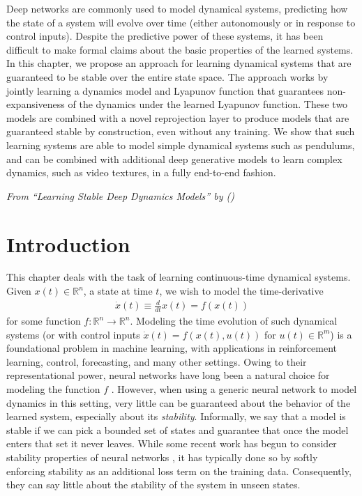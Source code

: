 Deep networks are commonly used to model dynamical systems, predicting how the state of a system will evolve over time (either autonomously or in response to control inputs). Despite the predictive power of these systems, it has been difficult to make formal claims about the basic properties of the learned systems. In this chapter, we propose an approach for learning dynamical systems that are guaranteed to be stable over the entire state space. The approach works by jointly learning a dynamics model and Lyapunov function that guarantees non-expansiveness of the dynamics under the learned Lyapunov function. These two models are combined with a novel reprojection layer to produce models that are guaranteed stable by construction, even without any training. We show that such learning systems are able to model simple dynamical systems such as pendulums, and can be combined with additional deep generative models to learn complex dynamics, such as video textures, in a fully end-to-end fashion.

\emph{From ``Learning Stable Deep Dynamics Models'' by \citeauthor{manek2019stable} (\citeyear{manek2019stable})}

\clearpage

\section{Introduction}

This chapter deals with the task of learning continuous-time dynamical systems. Given $x(t) \in \mathbb{R}^n$, a state at time $t$, we wish to model the time-derivative
\begin{align}
	\dot{x}(t) \equiv \frac{d}{dt}x(t) = f(x(t))
\end{align}
for some function $f : \mathbb{R}^n \rightarrow \mathbb{R}^n$. Modeling the time evolution of such dynamical systems (or with control inputs $\dot{x}(t) = f(x(t),u(t))$ for $u(t) \in \mathbb{R}^m$) is a foundational problem in machine learning, with applications in reinforcement learning, control, forecasting, and many other settings. Owing to their representational power, neural networks have long been a natural choice for modeling the function $f$ \citep{gu2016continuous,nagabandi2018neural,mishra2017prediction,gal2016improving}. However, when using a generic neural network to model dynamics in this setting, very little can be guaranteed about the behavior of the learned system, especially about its \emph{stability}. Informally, we say that a model is stable if we can pick a bounded set of states and guarantee that once the model enters that set it never leaves.  While some recent work has begun to consider stability properties of neural networks \citep{chow2018lyapunov,richards2018lyapunov,taylor2019episodic}, it has typically done so by softly enforcing stability as an additional loss term on the training data. Consequently, they can say little about the stability of the system in unseen states.

